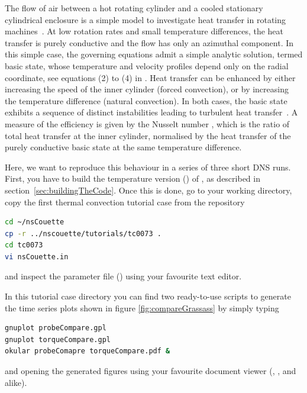 \documentclass[a4paper, 11pt, DIV=11]{scrartcl}
\begin{document}
The flow of air between a hot rotating cylinder and a cooled stationary
cylindrical enclosure is a simple model to investigate heat transfer in
rotating machines~\cite{Howey2012}. At low rotation rates and small temperature differences,
the heat transfer is purely conductive and the flow has only an azimuthal
component. In this simple case, the governing equations admit a simple
analytic solution, termed basic state, whose temperature and velocity
profiles depend only on the radial coordinate, see \eg equations (2) to (4)
in \cite{Lopez2015}. Heat transfer can be enhanced by either increasing the
speed of the inner cylinder (forced convection), or by increasing the
temperature difference (natural convection). In both cases, the basic state exhibits
a sequence of distinct instabilities leading to turbulent heat transfer~\cite{Lopez2015}. A
measure of the efficiency is given by the Nusselt number \Nui, which is the
ratio of total heat transfer at the inner cylinder, normalised by the heat transfer
of the purely conductive basic state at the same temperature difference.
\par
Here, we want to reproduce this behaviour in a series of three short DNS runs.
First, you have to build the temperature version () of \nsc,
as described in section~\ref{sec:buildingTheCode}.
Once this is done, go to your working directory, copy the first thermal convection
tutorial case from the repository
\begin{lstlisting}[language=bash]
cd ~/nsCouette
cp -r ../nscouette/tutorials/tc0073 .
cd tc0073
vi nsCouette.in
\end{lstlisting}
and inspect the parameter file () using your favourite 
text editor.



In this tutorial case directory you can find two ready-to-use scripts to
generate the time series plots shown in figure \ref{fig:compareGrassass} by
simply typing
\begin{lstlisting}[language=bash]
gnuplot probeCompare.gpl
gnuplot torqueCompare.gpl
okular probeComapre torqueCompare.pdf &
\end{lstlisting}
and opening the generated  figures using your favourite document 
viewer (\eg {}, ,  and alike).
\end{document}
